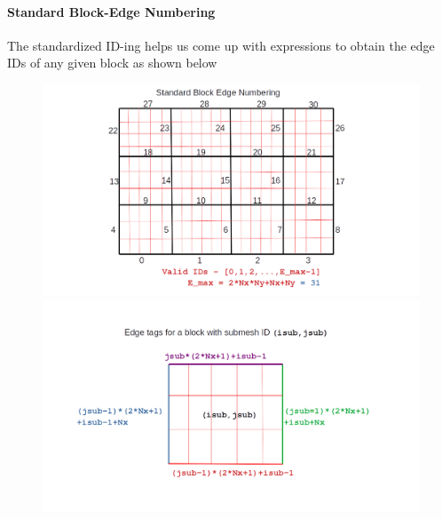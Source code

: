 \documentclass[a4paper,12pt]{article}
\begin{document}
\paragraph{Standard Block-Edge Numbering}
The standardized ID-ing helps us come up with expressions to obtain the edge IDs of any given block as shown below
\begin{figure}[H]
	\centering
	\includegraphics[trim=140 25 200 38,clip,scale=0.3]{figures/Block-Edge-Numbered.png}
	\includegraphics[trim=80 0 100 0,clip,scale=0.3]{figures/Std-Block-Edge-IDs.png}
\end{figure}
\end{document}
